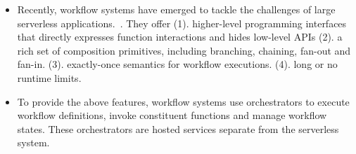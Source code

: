 \begin{itemize}





	\item Recently, workflow systems have emerged to tackle the challenges of
	large serverless applications.~\cite{excamera, gg-atc, aws-step-functions,
	google-cloud-composer, google-workflows, durable-functions}. They offer
	(1). higher-level programming interfaces that directly expresses function
	interactions and hides low-level APIs (2). a rich set of composition
	primitives, including branching, chaining, fan-out and fan-in. (3).
	exactly-once semantics for workflow executions. (4). long or no runtime
	limits.

	\item To provide the above features, workflow systems use orchestrators
	to execute workflow definitions, invoke constituent functions and manage
	workflow states. These orchestrators are hosted services separate from the
	serverless system.


\end{itemize}
